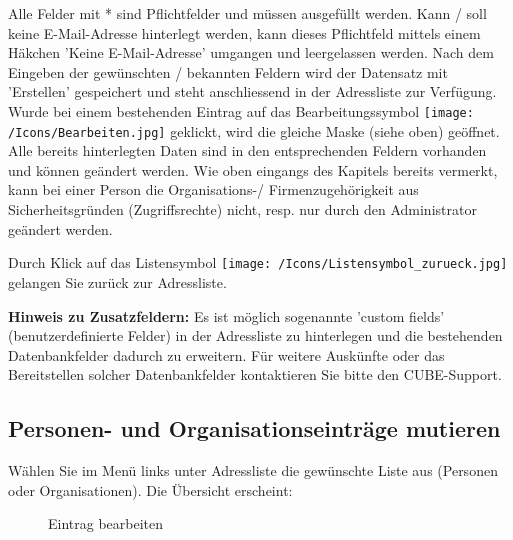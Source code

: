 \vspace{\baselineskip}
Alle Felder mit * sind Pflichtfelder und müssen ausgefüllt werden. Kann / soll keine E-Mail-Adresse hinterlegt werden, kann dieses Pflichtfeld mittels einem Häkchen 'Keine E-Mail-Adresse'  umgangen und leergelassen werden. Nach dem Eingeben der gewünschten / bekannten Feldern wird der Datensatz mit 'Erstellen'  gespeichert und steht anschliessend in der Adressliste zur Verfügung. Wurde bei einem bestehenden Eintrag auf das Bearbeitungssymbol \texttt{[image: /Icons/Bearbeiten.jpg]} geklickt, wird die gleiche Maske (siehe oben) geöffnet. Alle bereits hinterlegten Daten sind in den entsprechenden Feldern vorhanden und können geändert werden. Wie oben eingangs des Kapitels bereits vermerkt, kann bei einer Person die Organisations-/ Firmenzugehörigkeit aus Sicherheitsgründen (Zugriffsrechte) nicht, resp. nur durch den Administrator geändert werden.

\vspace{\baselineskip}

Durch Klick auf das Listensymbol \texttt{[image: /Icons/Listensymbol\_zurueck.jpg]}  gelangen Sie zurück zur Adressliste.

\vspace{\baselineskip}

\textbf{Hinweis zu Zusatzfeldern:} Es ist möglich sogenannte 'custom fields' (benutzerdefinierte Felder) in der Adressliste zu hinterlegen und die bestehenden Datenbankfelder dadurch zu erweitern. Für weitere Auskünfte oder das Bereitstellen solcher Datenbankfelder kontaktieren Sie bitte den CUBE-Support.

\subsection{Personen- und Organisationseinträge mutieren}

Wählen Sie im Menü links unter Adressliste die gewünschte Liste aus (Personen oder Organisationen). Die Übersicht erscheint:

\begin{figure}[H]
\caption{Eintrag bearbeiten}
\end{figure}

